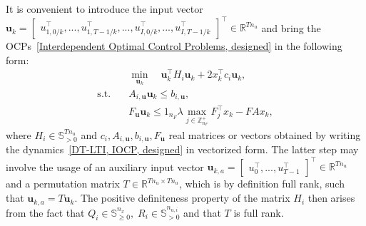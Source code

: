 \documentclass[letterpaper, 10 pt, conference]{ieeeconf}  %
\begin{document}
It is convenient to introduce the input vector $\mathbf{u}_{k} = \begin{bmatrix} u^{\top}_{1,0/k},...,u^{\top}_{1,T-1/k},...,u^{\top}_{I,0/k},...,u^{\top}_{I,T-1/k}\end{bmatrix}^{\top} \in \mathbb{R}^{Tn_{u}}$ and bring the OCPs~\eqref{Interdependent Optimal Control Problems, designed} in the following form:
\begin{subequations}\label{Generalized Nash Equilibrium Problem}
\begin{align}
& \min_{\mathbf{u}_{k}} \quad \mathbf{u}^{\top}_{k} H_{i} \mathbf{u}_{k} + 2x^{\top}_{k} c_{i} \mathbf{u}_{k},\\
\text{s.t.} \quad & A_{i,\mathbf{u}} \mathbf{u}_{k} \leq b_{i,\mathbf{u}},\label{Shared Constraint, all prediction time steps, designed, GNEP}\\
& F_{\mathbf{u}}\mathbf{u}_{k} \leq 1_{n_{F}} \lambda \max_{j \in \mathbb{Z}^{+}_{n_{F}}} F^{\top}_{j}x_{k} - F A x_{k}, \label{Shared constraint, initial prediction step, designed, GNEP}
\end{align}
\end{subequations}
where $H_{i} \in \mathbb{S}^{Tn_{u}}_{>0}$ and $c_{i}, A_{i,\mathbf{u}}, b_{i,\mathbf{u}}, F_{\mathbf{u}}$ real matrices or vectors obtained by writing the dynamics~\eqref{DT-LTI, IOCP, designed} in vectorized form. The latter step may involve the usage of an auxiliary input vector $\mathbf{u}_{k,a} = \begin{bmatrix} u^{\top}_{0},...,u^{\top}_{T-1}\end{bmatrix}^{\top} \in \mathbb{R}^{Tn_{u}}$ and a permutation matrix $T \in \mathbb{R}^{Tn_{u} \times Tn_{u}}$, which is by definition full rank, such that $\mathbf{u}_{k,a} = T \mathbf{u}_{k}$. The positive definiteness property of the matrix $H_{i}$ then arises from the fact that $Q_{i} \in \mathbb{S}^{n_x}_{\geq 0},\; R_{i} \in \mathbb{S}^{n_{u,i}}_{> 0}$ and that $T$ is full rank. 
\end{document}
